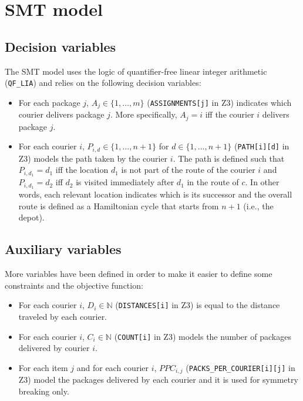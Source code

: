 \section{SMT model}


\subsection{Decision variables}

The SMT model uses the logic of quantifier-free linear integer arithmetic (\texttt{QF\_LIA}) and relies on the following decision variables:

\begin{itemize}
    \item For each package $j$, $A_j \in \{1, \dots, m\}$ (\texttt{ASSIGNMENTS[j]} in Z3) indicates which courier delivers package $j$. More specifically, $A_j = i$ iff the courier $i$ delivers package $j$.
    
    \item For each courier $i$, $P_{i,d} \in \{1, \dots, n + 1\}$ for $d \in \{1, \dots, n + 1\}$ (\texttt{PATH[i][d]} in Z3) models the path taken by the courier $i$. The path is defined such that $P_{i, d_1} = d_1$ iff the location $d_1$ is not part of the route of the courier $i$ and $P_{i, d_1} = d_2$ iff $d_2$ is visited immediately after $d_1$ in the route of $c$. In other words, each relevant location indicates which is its successor and the overall route is defined as a Hamiltonian cycle that starts from $n+1$ (i.e., the depot).

\end{itemize}

\subsection{Auxiliary variables}
More variables have been defined in order to make it easier to define some constraints and the objective function:

\begin{itemize}
    \item For each courier $i$, $D_i \in \mathbb{N}$ (\texttt{DISTANCES[i]} in Z3) is equal to the distance traveled by each courier.

    \item For each courier $i$, $C_i \in \mathbb{N}$ (\texttt{COUNT[i]} in Z3) models the number of packages delivered by courier $i$.

    \item For each item $j$ and for each courier $i$, $PPC_{i,j}$ (\texttt{PACKS\_PER\_COURIER[i][j]} in Z3) model the packages delivered by each courier and it is used for symmetry breaking only.
\end{itemize}

